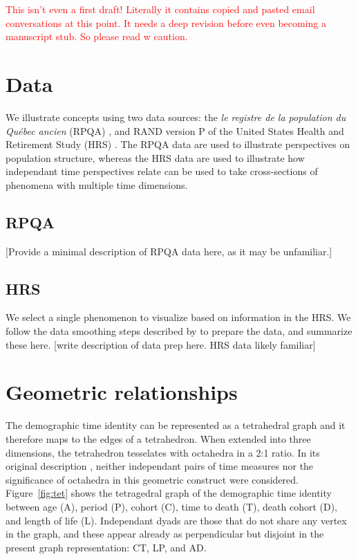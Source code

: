 \textcolor{red}{This isn't even a first draft! Literally it contains copied and
pasted email conversations at this point. It needs a deep revision before even
becoming a manuscript stub. So please read w caution.}

\section{Data}
We illustrate concepts using two data sources: the \emph{le registre de la
population du Qu\'{e}bec ancien} (RPQA) \citep{desjardins1998}, and RAND version
P of the United States Health and Retirement Study (HRS) \citep{HRS, RAND}. The
RPQA data are used to illustrate perspectives on population structure,
whereas the HRS data are used to illustrate how independant time perspectives
relate can be used to take cross-sections of phenomena with multiple time
dimensions.

\subsection{RPQA}
[Provide a minimal description of RPQA data here, as it may be unfamiliar.]

\subsection{HRS} 
We select a single phenomenon to visualize based on information in the HRS. We
follow the data smoothing steps described by \citet{riffe2017hle} to prepare the
data, and summarize these here.
[write description of data prep here. HRS data likely familiar]

\section{Geometric relationships}
The demographic time identity can be represented as a tetrahedral graph and it
therefore maps to the edges of a tetrahedron.
When extended into three dimensions, the tetrahedron tesselates with octahedra in a 2:1
ratio. In its original description \citep{riffe2017demographictime}, neither
independant pairs of time measures nor the significance of octahedra in this
geometric construct were considered. Figure~\ref{fig:tet}
shows the tetragedral graph of the demographic time identity between age
(A), period (P), cohort (C), time to death (T), death cohort (D), and length
of life (L). Independant dyads are those that do not share any vertex in the
graph, and these appear already as perpendicular but disjoint in the present
graph representation: CT, LP, and AD.

